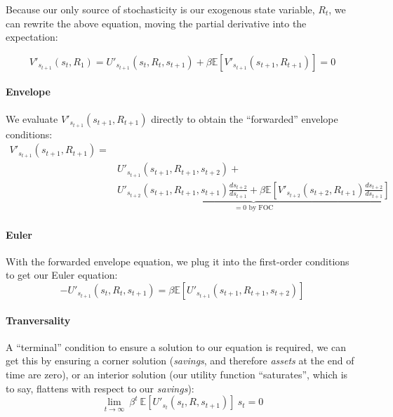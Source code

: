\documentclass[a4paper,12pt]{article}
\begin{document}
\noindent Because our only source of stochasticity is our exogenous state variable, $R_t$, we can rewrite the above equation, moving the partial derivative into the expectation:

$$
V'_{s_{t+1}}(s_{t}, R_{1}) = U'_{s_{t+1}}(s_t, R_t, s_{t+1}) + \beta \mathbb{E} [ V'_{s_{t+1}}(s_{t+1}, R_{t+1})] = 0
$$

\paragraph{Envelope} We evaluate $V'_{s_{t+1}}(s_{t+1}, R_{t+1})$ directly to obtain the ``forwarded'' envelope conditions:
%
\begin{align*}
V'_{s_{t+1}}(s_{t+1}, R_{t+1}) =& \\
&U'_{s_{t+1}}(s_{t+1}, R_{t+1}, s_{t+2}) + \\
&\underbrace{U'_{s_{t+2}}(s_{t+1}, R_{t+1}, s_{t+1})\frac{ds_{t+2}}{ds_{t+1}} + \beta \mathbb{E} [ V'_{s_{t+2}}(s_{t+2}, R_{t+1})\frac{ds_{t+2}}{ds_{t+1}}]}_{= 0 \text{ by FOC}}
\end{align*}
%
\paragraph{Euler}
With the forwarded envelope equation, we plug it into the first-order conditions to get our Euler equation:
%
$$
- U'_{s_{t+1}}(s_t, R_t, s_{t+1}) = \beta \mathbb{E} [U'_{s_{t+1}}(s_{t+1}, R_{t+1}, s_{t+2})]
$$
%
\paragraph{Tranversality} A ``terminal'' condition to ensure a solution to our equation is required, we can get this by ensuring a corner solution (\textit{savings}, and therefore \textit{assets} at the end of time are zero), or an interior solution (our utility function ``saturates'', which is to say, flattens with respect to our \textit{savings}):
%
$$
\lim_{t \rightarrow \infty} \ \beta^t\  \mathbb{E}[ U'_{s_t}(s_t, R, s_{t+1})] \ s_t = 0
$$
%
\end{document}
